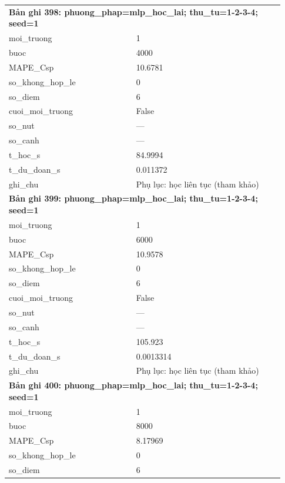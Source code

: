 \begin{longtable}{p{0.43\linewidth}p{0.50\linewidth}}
\midrule
\multicolumn{2}{p{0.95\linewidth}}{\textbf{Bản ghi 398: phuong\_phap=mlp\_hoc\_lai; thu\_tu=1-2-3-4; seed=1}} \\
moi\_\allowbreak truong & 1 \\
buoc & 4000 \\
MAPE\_\allowbreak Csp & 10.6781 \\
so\_\allowbreak khong\_\allowbreak hop\_\allowbreak le & 0 \\
so\_\allowbreak diem & 6 \\
cuoi\_\allowbreak moi\_\allowbreak truong & False \\
so\_\allowbreak nut & — \\
so\_\allowbreak canh & — \\
t\_\allowbreak hoc\_\allowbreak s & 84.9994 \\
t\_\allowbreak du\_\allowbreak doan\_\allowbreak s & 0.011372 \\
ghi\_\allowbreak chu & Phụ lục: học liên tục (tham khảo) \\
\midrule
\multicolumn{2}{p{0.95\linewidth}}{\textbf{Bản ghi 399: phuong\_phap=mlp\_hoc\_lai; thu\_tu=1-2-3-4; seed=1}} \\
moi\_\allowbreak truong & 1 \\
buoc & 6000 \\
MAPE\_\allowbreak Csp & 10.9578 \\
so\_\allowbreak khong\_\allowbreak hop\_\allowbreak le & 0 \\
so\_\allowbreak diem & 6 \\
cuoi\_\allowbreak moi\_\allowbreak truong & False \\
so\_\allowbreak nut & — \\
so\_\allowbreak canh & — \\
t\_\allowbreak hoc\_\allowbreak s & 105.923 \\
t\_\allowbreak du\_\allowbreak doan\_\allowbreak s & 0.0013314 \\
ghi\_\allowbreak chu & Phụ lục: học liên tục (tham khảo) \\
\midrule
\multicolumn{2}{p{0.95\linewidth}}{\textbf{Bản ghi 400: phuong\_phap=mlp\_hoc\_lai; thu\_tu=1-2-3-4; seed=1}} \\
moi\_\allowbreak truong & 1 \\
buoc & 8000 \\
MAPE\_\allowbreak Csp & 8.17969 \\
so\_\allowbreak khong\_\allowbreak hop\_\allowbreak le & 0 \\
so\_\allowbreak diem & 6 \\

\end{longtable}
